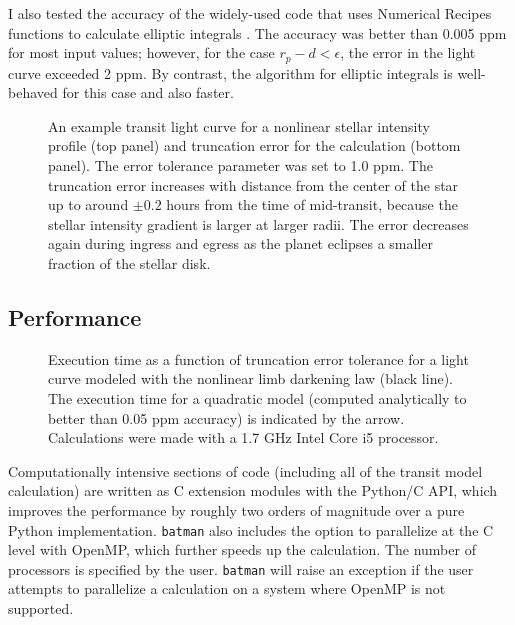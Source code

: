 \documentclass[12pt,preprint]{aastex}
\begin{document}
I also tested the accuracy of the widely-used \cite{mandel02} code that uses Numerical Recipes functions to calculate elliptic integrals \citep{press92}.  The accuracy was better than 0.005 ppm for most input values; however, for the case $r_p - d < \epsilon$, the error in the light curve exceeded 2 ppm. By contrast, the \cite{bulirsch65} algorithm for elliptic integrals is well-behaved for this case and also faster.

\begin{figure}
\caption{An example transit light curve for a nonlinear stellar intensity profile (top panel) and truncation error for the calculation (bottom panel).  The error tolerance parameter was set to 1.0 ppm.  The truncation error increases with distance from the center of the star up to around $\pm0.2$ hours from the time of mid-transit, because the stellar intensity gradient is larger at larger radii. The error decreases again during ingress and egress as the planet eclipses a smaller fraction of the stellar disk.}
\label{fig:transit}
\end{figure}


\subsection{Performance}
\begin{figure}
\caption{Execution time as a function of truncation error tolerance for a light curve modeled with the nonlinear limb darkening law (black line). The execution time for a quadratic model (computed analytically to better than 0.05 ppm accuracy) is indicated by the arrow. Calculations were made with a 1.7 GHz Intel Core i5 processor.} 
\label{fig:performance}
\end{figure}

Computationally intensive sections of code (including all of the transit model calculation) are written as C extension modules with the Python/C API, which improves the performance by roughly two orders of magnitude over a pure Python implementation.  \texttt{batman} also includes the option to parallelize at the C level with OpenMP, which further speeds up the calculation. The number of processors is specified by the user.  \texttt{batman} will raise an exception if the user attempts to parallelize a calculation on a system where OpenMP is not supported.
\end{document}
